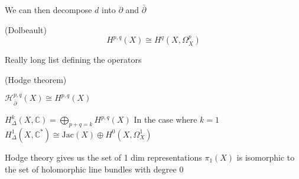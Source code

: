 We can then decompose $ d$ into $ \partial$ and $ \bar{\partial} $ 

\begin{theorem}
    (Dolbeault) 
    \begin{equation}
        H^{p,q} ( X) \cong H^q ( X, \Omega ^p _X ) 
    \end{equation}
\end{theorem}

Really long list defining the operators 

\begin{theorem}
    (Hodge theorem) 
\end{theorem}

\begin{theorem}
    $ \mathcal{H} ^{p,q} _{\bar{\partial} } (X) \cong H^{p,q} (X) $ 
\end{theorem}

\begin{theorem}
    $H^k _{\Delta } ( X, \mathbb{C} ) = \bigoplus _{p+q = k }  H^{p,q} ( X) $
    In the case where $ k = 1 $
    $H^1 _\Delta ( X, \mathbb{C}  ^* ) \cong \mathrm{Jac} (X) \oplus H^0 ( X, \Omega_X ^ 1) $
\end{theorem}


Hodge theory gives us the set of 1 dim representations $\pi_1(X) $ is isomorphic to the set of holomorphic line bundles with degree 0 







 

